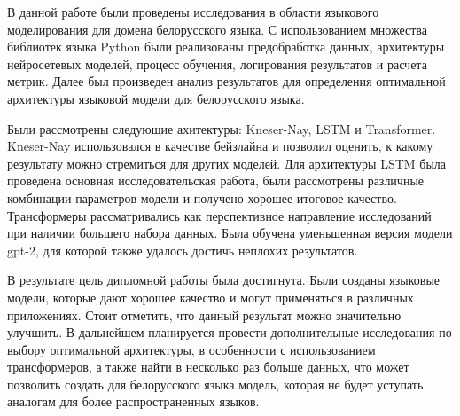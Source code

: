 
В данной работе были проведены исследования в области языкового моделирования для домена белорусского языка. С использованием множества библиотек языка Python были реализованы предобработка данных, архитектуры нейросетевых моделей, процесс обучения, логирования результатов и расчета метрик. Далее был произведен анализ результатов для определения оптимальной архитектуры языковой модели для белорусского языка.

Были рассмотрены следующие ахитектуры: Kneser-Nay, LSTM и Transformer. Kneser-Nay использовался в качестве бейзлайна и позволил оценить, к какому результату можно стремиться для других моделей. Для архитектуры LSTM была проведена основная исследовательская работа, были рассмотрены различные комбинации параметров модели и получено хорошее итоговое качество. Трансформеры рассматривались как перспективное направление исследований при наличии большего набора данных. Была обучена уменьшенная версия модели gpt-2, для которой также удалось достичь неплохих результатов.

В результате цель дипломной работы была достигнута. Были созданы языковые модели, которые дают хорошее качество и могут применяться в различных приложениях. Стоит отметить, что данный результат можно значительно улучшить. В дальнейшем планируется провести дополнительные исследования по выбору оптимальной архитектуры, в особенности с использованием трансформеров, а также найти в несколько раз больше данных, что может позволить создать для белорусского языка модель, которая не будет уступать аналогам для более распространенных языков.
